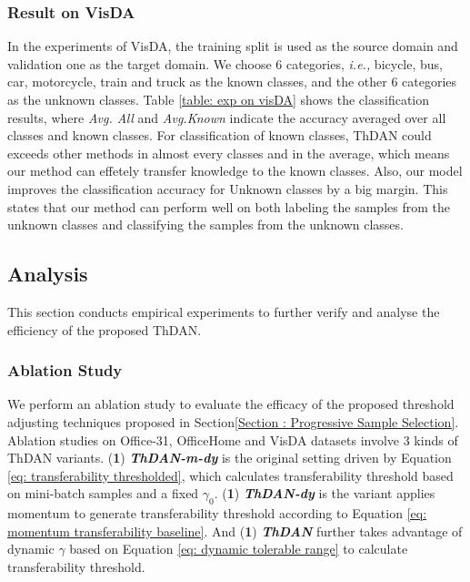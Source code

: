 \subsubsection{Result on VisDA}
In the experiments of VisDA, the training split is used as the source domain and validation one as the target domain. 
We choose 6 categories, \textit{i.e.,} bicycle, bus, car, motorcycle, train and truck as the known classes, and the other 6 categories as the unknown classes. 
Table \ref{table: exp on visDA} shows the classification results, where \textit{Avg. All} and \textit{Avg.Known} indicate the accuracy averaged over all classes and known classes. 
For classification of known classes, ThDAN could exceeds other methods in almost every classes and in the average, which means our method can effetely transfer knowledge to the known classes. 
Also, our model improves the classification accuracy for Unknown classes by a big margin. 
This states that our method can perform well on both labeling the samples from the unknown classes and classifying the samples from the unknown classes. 



\subsection{Analysis}
This section conducts empirical experiments to further verify and analyse the efficiency of the proposed ThDAN.
\subsubsection{Ablation Study}
We perform an ablation study to evaluate the efficacy of the proposed threshold adjusting techniques proposed in Section\ref{Section : Progressive Sample Selection}. 
Ablation studies on Office-31, OfficeHome and VisDA datasets involve 3 kinds of ThDAN variants.
(\textbf{1}) \textit{\textbf{ThDAN-m-dy}} is the original setting driven by Equation \ref{eq: transferability thresholded}, which calculates transferability threshold based on mini-batch samples and a fixed $\gamma_0$. 
(\textbf{1}) \textit{\textbf{ThDAN-dy}} is the variant applies momentum to generate transferability threshold according to Equation \ref{eq: momentum transferability baseline}. 
And  (\textbf{1}) \textit{\textbf{ThDAN}} further takes advantage of dynamic $\gamma$ based on Equation \ref{eq: dynamic tolerable range} to calculate transferability threshold. 


